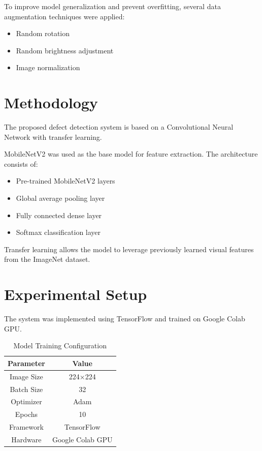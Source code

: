 \documentclass[conference]{IEEEtran}
\begin{document}
To improve model generalization and prevent overfitting, several data augmentation techniques were applied:

\begin{itemize}
\item Random rotation
\item Random brightness adjustment
\item Image normalization
\end{itemize}

\section{Methodology}

The proposed defect detection system is based on a Convolutional Neural Network with transfer learning.

MobileNetV2 was used as the base model for feature extraction. The architecture consists of:

\begin{itemize}
\item Pre-trained MobileNetV2 layers
\item Global average pooling layer
\item Fully connected dense layer
\item Softmax classification layer
\end{itemize}

Transfer learning allows the model to leverage previously learned visual features from the ImageNet dataset.

\section{Experimental Setup}

The system was implemented using TensorFlow and trained on Google Colab GPU.

\begin{table}[H]
\centering
\begin{tabular}{|c|c|}
\hline
Parameter & Value \\
\hline
Image Size & 224×224 \\
Batch Size & 32 \\
Optimizer & Adam \\
Epochs & 10 \\
Framework & TensorFlow \\
Hardware & Google Colab GPU \\
\hline
\end{tabular}
\caption{Model Training Configuration}
\end{table}
\end{document}
